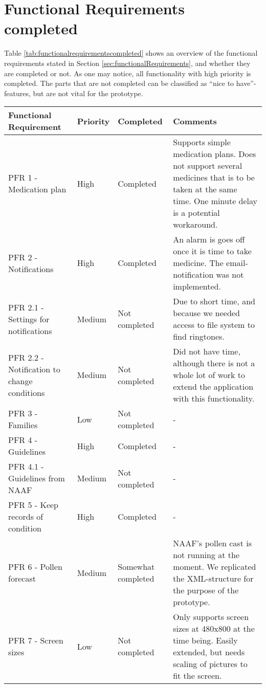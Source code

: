 \section{Functional Requirements completed}
\label{sec:frcompleted}
Table \ref{tab:functionalrequirementscompleted} shows an overview of the functional requirements stated in Section \ref{sec:functionalRequirements}, and whether they are completed or not.
As one may notice, all functionality with high priority is completed. The parts that are not completed can be classified as ``nice to have''-features, but are not vital 
for the prototype.
\begin{table}
\centering
\begin{sideways}
\begin{tabular}{|p{5.0cm} | l | l | p{9.5cm} |}
\hline
Functional Requirement & Priority & Completed & Comments \\
\hline
PFR 1 - Medication plan & High & Completed & Supports simple medication plans. Does not support several medicines that is to be taken at the same time. One minute delay is a potential workaround. \\
\hline
PFR 2 - Notifications & High & Completed & An alarm is goes off once it is time to take medicine. The email-notification was not implemented. \\
\hline
PFR 2.1 - Settings for notifications & Medium & Not completed & Due to short time, and because we needed access to file system to find ringtones. \\
\hline
PFR 2.2 - Notification to change conditions & Medium &  Not completed & Did not have time, although there is not a whole lot of work to extend the application with this functionality. \\
\hline 
PFR 3 - Families & Low & Not completed & - \\
\hline
PFR 4 - Guidelines & High & Completed & - \\
\hline
PFR 4.1 - Guidelines from NAAF & Medium & Not completed & - \\
\hline  
PFR 5 - Keep records of condition & High  & Completed & - \\
\hline
PFR 6 - Pollen forecast & Medium & Somewhat completed & NAAF's pollen cast is not running at the moment. We replicated the XML-structure for the purpose of the prototype.\\
\hline  
PFR 7 - Screen sizes & Low  & Not completed & Only supports screen sizes at 480x800 at the time being. Easily extended, but needs scaling of pictures to fit the screen. \\

\end{tabular}
\end{sideways}
\end{table}
